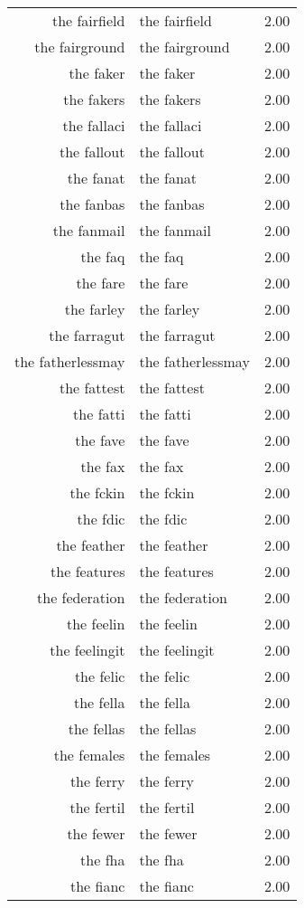 \begin{table}[ht]
\begin{tabular}{rlr}
  the fairfield & the fairfield & 2.00 \\ 
  the fairground & the fairground & 2.00 \\ 
  the faker & the faker & 2.00 \\ 
  the fakers & the fakers & 2.00 \\ 
  the fallaci & the fallaci & 2.00 \\ 
  the fallout & the fallout & 2.00 \\ 
  the fanat & the fanat & 2.00 \\ 
  the fanbas & the fanbas & 2.00 \\ 
  the fanmail & the fanmail & 2.00 \\ 
  the faq & the faq & 2.00 \\ 
  the fare & the fare & 2.00 \\ 
  the farley & the farley & 2.00 \\ 
  the farragut & the farragut & 2.00 \\ 
  the fatherlessmay & the fatherlessmay & 2.00 \\ 
  the fattest & the fattest & 2.00 \\ 
  the fatti & the fatti & 2.00 \\ 
  the fave & the fave & 2.00 \\ 
  the fax & the fax & 2.00 \\ 
  the fckin & the fckin & 2.00 \\ 
  the fdic & the fdic & 2.00 \\ 
  the feather & the feather & 2.00 \\ 
  the features & the features & 2.00 \\ 
  the federation & the federation & 2.00 \\ 
  the feelin & the feelin & 2.00 \\ 
  the feelingit & the feelingit & 2.00 \\ 
  the felic & the felic & 2.00 \\ 
  the fella & the fella & 2.00 \\ 
  the fellas & the fellas & 2.00 \\ 
  the females & the females & 2.00 \\ 
  the ferry & the ferry & 2.00 \\ 
  the fertil & the fertil & 2.00 \\ 
  the fewer & the fewer & 2.00 \\ 
  the fha & the fha & 2.00 \\ 
  the fianc & the fianc & 2.00 \\ 

\end{tabular}
\end{table}
